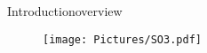 \begin{frame}{Introduction}{overview}
	\begin{figure}[H]
		\centering
		\texttt{[image: Pictures/SO3.pdf]}
	\end{figure}
\end{frame}
%
%
%
%
%
